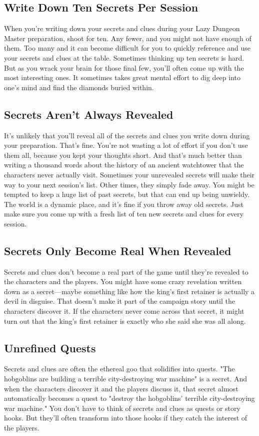 \documentclass[10pt,a4paper,twoside,bg=print,twocolumn,openany,nodeprecatedcode]{dndbook}
\begin{document}
\subsection{Write Down Ten Secrets Per Session}
When you're writing down your secrets and clues during your Lazy Dungeon Master preparation, shoot for ten. Any fewer, and you might not have enough of them. Too many and it can become difficult for you to quickly reference and use your secrets and clues at the table.
Sometimes thinking up ten secrets is hard. But as you wrack your brain for those final few, you'll often come up with the most interesting ones. It sometimes takes great mental effort to dig deep into one's mind and find the diamonds buried within.
\subsection{Secrets Aren't Always Revealed}
It's unlikely that you'll reveal all of the secrets and clues you write down during your preparation. That's fine. You're not wasting a lot of effort if you don't use them all, because you kept your thoughts short. And that's much better than writing a thousand words about the history of an ancient watchtower that the characters never actually visit.
Sometimes your unrevealed secrets will make their way to your next session's list. Other times, they simply fade away. You might be tempted to keep a huge list of past secrets, but that can end up being unwieldy. The world is a dynamic place, and it's fine if you throw away old secrets. Just make sure you come up with a fresh list of ten new secrets and clues for every session.
\subsection{Secrets Only Become Real When Revealed}
Secrets and clues don't become a real part of the game until they're revealed to the characters and the players. You might have some crazy revelation written down as a secret—maybe something like how the king's first retainer is actually a devil in disguise. That doesn't make it part of the campaign story until the characters discover it. If the characters never come across that secret, it might turn out that the king's first retainer is exactly who she said she was all along.
\subsection{Unrefined Quests}
Secrets and clues are often the ethereal goo that solidifies into quests. "The hobgoblins are building a terrible city-destroying war machine" is a secret. And when the characters discover it and the players discuss it, that secret almost automatically becomes a quest to "destroy the hobgoblins' terrible city-destroying war machine." You don't have to think of secrets and clues as quests or story hooks. But they'll often transform into those hooks if they catch the interest of the players.
\end{document}
